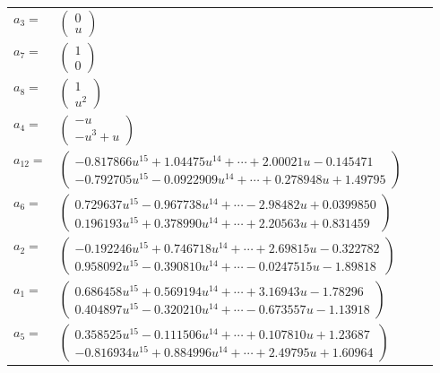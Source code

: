 \documentclass[1p]{elsarticle_modified}
\theoremstyle{definition}
\begin{document}
\begin{tabular}{m{7pt} m{180pt} m{7pt} m{180pt} }
\flushright $a_{3}=$&$\begin{pmatrix}0\\u\end{pmatrix}$ \\
\flushright $a_{7}=$&$\begin{pmatrix}1\\0\end{pmatrix}$ \\
\flushright $a_{8}=$&$\begin{pmatrix}1\\u^2\end{pmatrix}$ \\
\flushright $a_{4}=$&$\begin{pmatrix}- u\\- u^3+u\end{pmatrix}$ \\
\flushright $a_{12}=$&$\begin{pmatrix}-0.817866 u^{15}+1.04475 u^{14}+\cdots+2.00021 u-0.145471\\-0.792705 u^{15}-0.0922909 u^{14}+\cdots+0.278948 u+1.49795\end{pmatrix}$ \\
\flushright $a_{6}=$&$\begin{pmatrix}0.729637 u^{15}-0.967738 u^{14}+\cdots-2.98482 u+0.0399850\\0.196193 u^{15}+0.378990 u^{14}+\cdots+2.20563 u+0.831459\end{pmatrix}$ \\
\flushright $a_{2}=$&$\begin{pmatrix}-0.192246 u^{15}+0.746718 u^{14}+\cdots+2.69815 u-0.322782\\0.958092 u^{15}-0.390810 u^{14}+\cdots-0.0247515 u-1.89818\end{pmatrix}$ \\
\flushright $a_{1}=$&$\begin{pmatrix}0.686458 u^{15}+0.569194 u^{14}+\cdots+3.16943 u-1.78296\\0.404897 u^{15}-0.320210 u^{14}+\cdots-0.673557 u-1.13918\end{pmatrix}$ \\
\flushright $a_{5}=$&$\begin{pmatrix}0.358525 u^{15}-0.111506 u^{14}+\cdots+0.107810 u+1.23687\\-0.816934 u^{15}+0.884996 u^{14}+\cdots+2.49795 u+1.60964\end{pmatrix}$ \\

\end{tabular}
\end{document}
